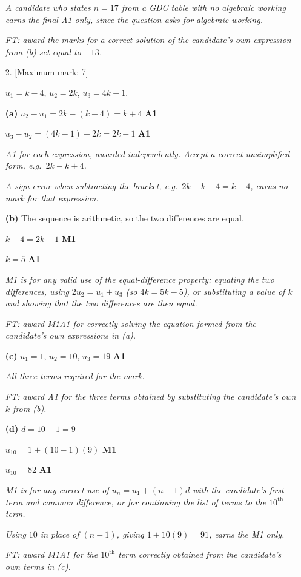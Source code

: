 \documentclass[12pt, twoside]{article}
\begin{document}
\begin{enumerate}[itemsep=0.3cm]
\emph{A candidate who states $n = 17$ from a GDC table with no
algebraic working earns the final A1 only, since the question asks
for algebraic working.}

\emph{FT: award the marks for a correct solution of the candidate's own
expression from (b) set equal to $-13$.}

\newpage

\item[2.] [Maximum mark: 7]

$u_{1} = k - 4$, \quad $u_{2} = 2k$, \quad $u_{3} = 4k - 1$.

\medskip

\textbf{(a)} $u_{2} - u_{1} = 2k - (k - 4) = k + 4$ \hfill \textbf{A1}

$u_{3} - u_{2} = (4k - 1) - 2k = 2k - 1$ \hfill \textbf{A1}

\emph{A1 for each expression, awarded independently. Accept a correct
unsimplified form, e.g.\ $2k - k + 4$.}

\emph{A sign error when subtracting the bracket, e.g.\ $2k - k - 4 = k - 4$,
earns no mark for that expression.}

\medskip

\textbf{(b)} The sequence is arithmetic, so the two differences are equal.

$k + 4 = 2k - 1$ \hfill \textbf{M1}

$k = 5$ \hfill \textbf{A1}

\emph{M1 is for any valid use of the equal-difference property: equating
the two differences, using $2u_{2} = u_{1} + u_{3}$ (so $4k = 5k - 5$), or
substituting a value of $k$ and showing that the two differences are then
equal.}

\emph{FT: award M1A1 for correctly solving the equation formed from the
candidate's own expressions in (a).}

\medskip

\textbf{(c)} $u_{1} = 1$, \quad $u_{2} = 10$, \quad $u_{3} = 19$ \hfill \textbf{A1}

\emph{All three terms required for the mark.}

\emph{FT: award A1 for the three terms obtained by substituting the
candidate's own $k$ from (b).}

\medskip

\textbf{(d)} $d = 10 - 1 = 9$

$u_{10} = 1 + (10 - 1)(9)$ \hfill \textbf{M1}

$u_{10} = 82$ \hfill \textbf{A1}

\emph{M1 is for any correct use of $u_{n} = u_{1} + (n-1)d$ with the
candidate's first term and common difference, or for continuing the list
of terms to the $10^{\text{th}}$ term.}

\emph{Using $10$ in place of $(n - 1)$, giving $1 + 10(9) = 91$, earns
the M1 only.}

\emph{FT: award M1A1 for the $10^{\text{th}}$ term correctly obtained
from the candidate's own terms in (c).}

\end{enumerate}
\end{document}
